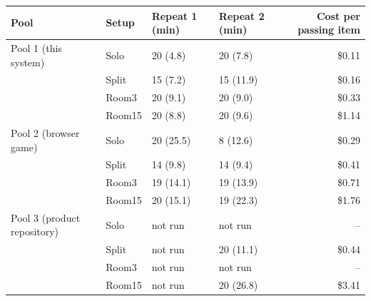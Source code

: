 \begin{tabular}{llllr}
\toprule
Pool & Setup & Repeat 1 (min) & Repeat 2 (min) & Cost per passing item \\
\midrule
Pool 1 (this system) & Solo & 20 (4.8) & 20 (7.8) & \$0.11 \\
 & Split & 15 (7.2) & 15 (11.9) & \$0.16 \\
 & Room3 & 20 (9.1) & 20 (9.0) & \$0.33 \\
 & Room15 & 20 (8.8) & 20 (9.6) & \$1.14 \\
\midrule
Pool 2 (browser game) & Solo & 20 (25.5) & 8 (12.6) & \$0.29 \\
 & Split & 14 (9.8) & 14 (9.4) & \$0.41 \\
 & Room3 & 19 (14.1) & 19 (13.9) & \$0.71 \\
 & Room15 & 20 (15.1) & 19 (22.3) & \$1.76 \\
\midrule
Pool 3 (product repository) & Solo & not run & not run & -- \\
 & Split & not run & 20 (11.1) & \$0.44 \\
 & Room3 & not run & not run & -- \\
 & Room15 & not run & 20 (26.8) & \$3.41 \\
\bottomrule
\end{tabular}
